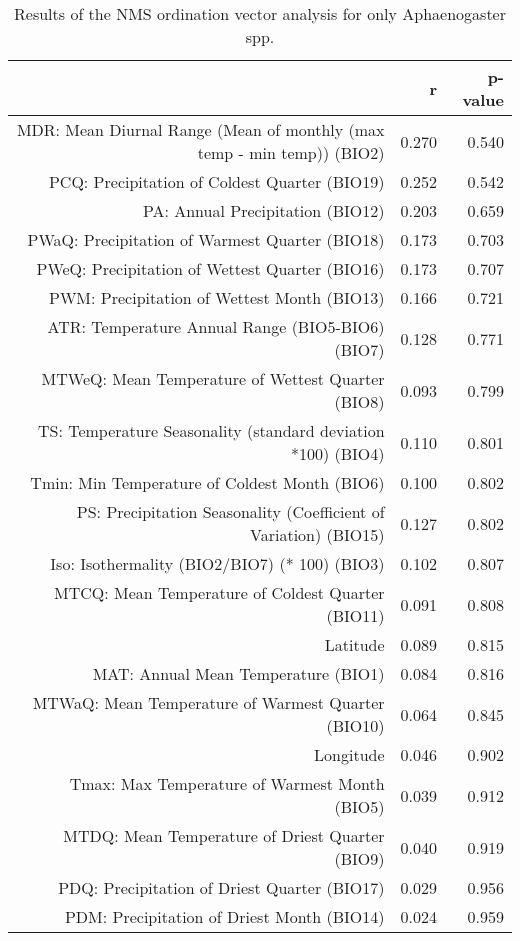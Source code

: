 \begin{table}[ht]
\centering
\begin{tabular}{rrr}
  \hline
 & r & p-value \\ 
  \hline
MDR: Mean Diurnal Range (Mean of monthly (max temp - min temp)) (BIO2) & 0.270 & 0.540 \\ 
  PCQ: Precipitation of Coldest Quarter (BIO19) & 0.252 & 0.542 \\ 
  PA: Annual Precipitation (BIO12) & 0.203 & 0.659 \\ 
  PWaQ: Precipitation of Warmest Quarter (BIO18) & 0.173 & 0.703 \\ 
  PWeQ: Precipitation of Wettest Quarter (BIO16) & 0.173 & 0.707 \\ 
  PWM: Precipitation of Wettest Month (BIO13) & 0.166 & 0.721 \\ 
  ATR: Temperature Annual Range (BIO5-BIO6) (BIO7) & 0.128 & 0.771 \\ 
  MTWeQ: Mean Temperature of Wettest Quarter (BIO8) & 0.093 & 0.799 \\ 
  TS: Temperature Seasonality (standard deviation *100) (BIO4) & 0.110 & 0.801 \\ 
  Tmin: Min Temperature of Coldest Month (BIO6) & 0.100 & 0.802 \\ 
  PS: Precipitation Seasonality (Coefficient of Variation) (BIO15) & 0.127 & 0.802 \\ 
  Iso: Isothermality (BIO2/BIO7) (* 100) (BIO3) & 0.102 & 0.807 \\ 
  MTCQ: Mean Temperature of Coldest Quarter (BIO11) & 0.091 & 0.808 \\ 
  Latitude & 0.089 & 0.815 \\ 
  MAT: Annual Mean Temperature (BIO1) & 0.084 & 0.816 \\ 
  MTWaQ: Mean Temperature of Warmest Quarter (BIO10) & 0.064 & 0.845 \\ 
  Longitude & 0.046 & 0.902 \\ 
  Tmax: Max Temperature of Warmest Month (BIO5) & 0.039 & 0.912 \\ 
  MTDQ: Mean Temperature of Driest Quarter (BIO9) & 0.040 & 0.919 \\ 
  PDQ: Precipitation of Driest Quarter (BIO17) & 0.029 & 0.956 \\ 
  PDM: Precipitation of Driest Month (BIO14) & 0.024 & 0.959 \\ 
   \hline
\end{tabular}
\caption{Results of the NMS ordination vector analysis for only Aphaenogaster spp.} 
\label{tab:wc_apg_vec}
\end{table}
